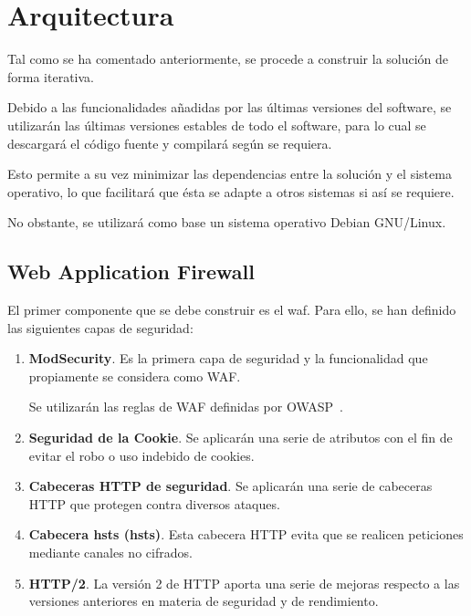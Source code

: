 \section{Arquitectura}
\par Tal como se ha comentado anteriormente, se procede a construir la solución de forma iterativa.
\par Debido a las funcionalidades añadidas por las últimas versiones del software, se utilizarán las últimas versiones estables de todo el software, para lo cual se descargará el código fuente y compilará según se
requiera.
\par Esto permite a su vez minimizar las dependencias entre la solución y el sistema operativo, lo que facilitará que ésta se adapte a otros sistemas si así se requiere.
\par No obstante, se utilizará como base un sistema operativo Debian GNU/Linux.

\subsection{Web Application Firewall}
\par El primer componente que se debe construir es el \acrshort{waf}. Para ello, se han definido las siguientes capas de seguridad:
\begin{enumerate}
  \item {\bf ModSecurity}. Es la primera capa de seguridad y la funcionalidad que propiamente se considera como WAF.
    \par Se utilizarán las reglas de WAF definidas por OWASP~\cite{owaspcrs}.
  \item {\bf Seguridad de la Cookie}. Se aplicarán una serie de atributos con el fin de evitar el robo o uso indebido de cookies.
  \item {\bf Cabeceras HTTP de seguridad}. Se aplicarán una serie de cabeceras HTTP que protegen contra diversos ataques.
  \item {\bf Cabecera \acrlong{hsts} (\acrshort{hsts})}. Esta cabecera HTTP evita que se realicen peticiones mediante canales no cifrados.
  \item {\bf HTTP/2}. La versión 2 de HTTP aporta una serie de mejoras respecto a las versiones anteriores en materia de seguridad y de rendimiento.
\end{enumerate}


